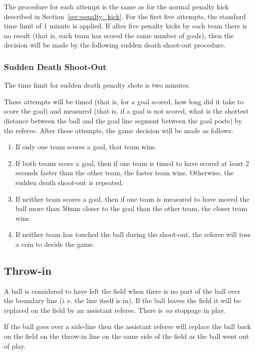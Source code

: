 \documentclass[12pt]{article}
\newcommand{\ie}{\mbox{i.\,e.}\xspace}
\begin{document}
The procedure for each attempt is the same as for the normal penalty
kick described in Section~\ref{sec:penalty_kick}. For the first five
attempts, the standard time limit of 1 minute is applied. If after five penalty kicks by each team
there is no result (that is, each team has scored the same number of goals), then the decision will be made by the following sudden death shoot-out procedure.

\subsubsection{Sudden Death Shoot-Out}

The time limit for sudden death penalty shots is two minutes.

These attempts will be timed (that is, for a goal scored, how long did it take to score the goal) and measured (that is, if a goal is not scored, what is the shortest distance between the ball and the goal line segment between the goal posts) by the referee. After these attempts, the game decision will be made as follows:
\begin{enumerate}
  \item {If only one team scores a goal, that team wins.}
  \item {If both teams score a goal, then if one team is timed to have scored at least 2 seconds faster than the other team, the faster team wins. Otherwise, the sudden death shoot-out is repeated.}
  \item {If neither team scores a goal, then if one team is measured to have moved the ball more than 50mm closer to the goal than the other team, the closer team wins.}
  \item {If neither team has touched the ball during the shoot-out, the referee will toss a coin to decide the game.}
\end{enumerate}

\subsection{Throw-in}

A ball is considered to have left the field when there is no part of the ball
over the boundary line  (\ie the line itself is in).
If the ball leaves the field it will be replaced on the field by an
assistant referee. There is \emph{no} stoppage in play.

If the ball goes over a side-line then the assistant referee will
replace the ball back on the field on the throw-in line on the same
side of the field as the ball went out of play.
\end{document}
